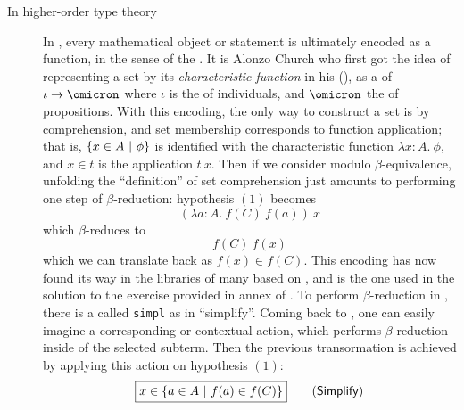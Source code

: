 \begin{description}
  \item[In higher-order type theory] In , every mathematical
  object or statement is ultimately encoded as a function, in the sense of the
  . It is Alonzo Church who first got the idea of representing
  a set by its \emph{characteristic function} in his 
  (), as a  of  $\iota \to \omicron$ where
  $\iota$ is the  of individuals, and $\omicron$ the  of
  propositions. With this encoding, the only way to construct
  a set is by comprehension, and set membership corresponds to function
  application; that is, $\left\{x \in A ~\middle|~ \phi\right\}$ is identified with the
  characteristic function $\lambda x{:}A.\ \phi$, and $x \in t$ is the
  application $t\ x$. Then if we consider  modulo
  $\beta$-equivalence, unfolding the ``definition'' of set comprehension just
  amounts to performing one step of $\beta$-reduction:
  hypothesis $(1)$ becomes
  $$(\lambda a{:}A.\ f(C)\ f(a))\ x$$
  which $\beta$-reduces to
  $$f(C)\ f(x)$$ which we can translate back as $f(x) \in f(C)$. This encoding
  has now found its way in the libraries of many  based on , and is the one used in the  solution to the exercise provided in
  annex of \cite{bartzia:hal-04087080}. To perform $\beta$-reduction in ,
  there is a  called \texttt{simpl} as in ``simplify''. Coming back to , one can
  easily imagine a corresponding  or 
  contextual action, which performs $\beta$-reduction inside of the selected
  subterm. Then the previous transormation is achieved by applying this action
  on hypothesis $(1)$:
  $$\fbox{$x \in \left\{a \in A ~\middle|~ f(a) \in f(C)\right\}$} \qquad \text{(\textsf{Simplify})}$$
\end{description}
